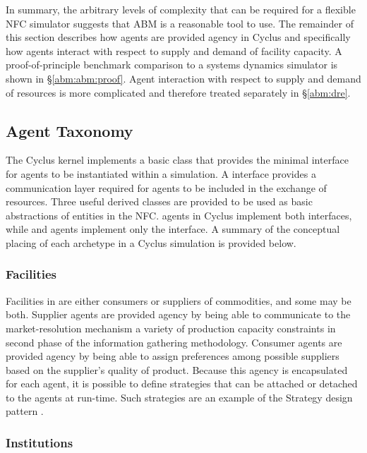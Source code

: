 In summary, the arbitrary levels of complexity that can be required for a
flexible NFC simulator suggests that ABM is a reasonable tool to use. The
remainder of this section describes how agents are provided agency in Cyclus and
specifically how agents interact with respect to supply and demand of facility
capacity. A proof-of-principle benchmark comparison to a systems dynamics
simulator is shown in \S \ref{abm:abm:proof}. Agent interaction with respect to
supply and demand of resources is more complicated and therefore treated
separately in \S \ref{abm:dre}.

\subsection{Agent Taxonomy}\label{abm:abm:tax}

The Cyclus kernel implements a basic  class that provides the
minimal interface for agents to be instantiated within a simulation. A
 interface provides a communication layer required for agents to be
included in the exchange of resources. Three useful derived classes are provided
to be used as basic abstractions of entities in the NFC.  agents
in Cyclus implement both interfaces, while  and 
agents implement only the  interface.  A summary of the conceptual
placing of each archetype in a Cyclus simulation is provided below.

\subsubsection{Facilities}

Facilities in \Cyclus are either consumers or suppliers of commodities, and some
may be both. Supplier agents are provided agency by being able to communicate to
the market-resolution mechanism a variety of production capacity constraints in
second phase of the information gathering methodology. Consumer agents are
provided agency by being able to assign preferences among possible suppliers
based on the supplier's quality of product. Because this agency is encapsulated
for each agent, it is possible to define strategies that can be attached or
detached to the agents at run-time. Such strategies are an example of the
Strategy design pattern \cite{vlissides_design_1995}.

\subsubsection{Institutions}

